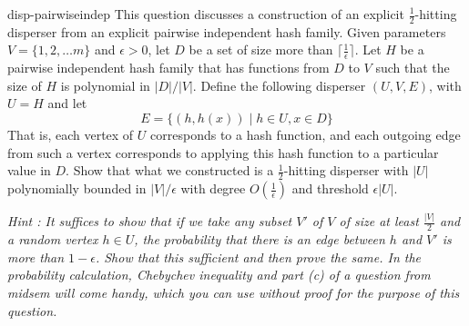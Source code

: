 \begin{exercise-prob}
\begin{show-ps4}{disp-pairwiseindep}
This question discusses a construction of an explicit $\frac{1}{2}$-hitting disperser from an explicit pairwise independent hash family. Given parameters $V = \{1,2,\ldots m\}$ and $\epsilon > 0$, let $D$ be a set of size more than $\lceil \frac{1}{\epsilon} \rceil$. Let $H$ be a pairwise independent hash family that has functions from $D$ to $V$ such that the size of $H$ is polynomial in $|D|/|V|$. Define the following disperser $(U,V,E)$, with $U = H$ and let $$E = \{(h,h(x)) \mid h \in U, x \in D\}$$ That is, each vertex of $U$ corresponds to a hash function, and each outgoing edge from such a vertex corresponds to applying this hash function to a particular value in $D$. Show that what we constructed is a $\frac{1}{2}$-hitting disperser with $|U|$ polynomially bounded in $|V|/\epsilon$ with degree $O(\frac{1}{\epsilon})$ and threshold $\epsilon |U|$.

{\em Hint : It suffices to show that if we take any subset $V'$ of $V$ of size at least $\frac{|V|}{2}$ and a random vertex $h \in U$, the probability that there is an edge between $h$ and $V'$ is more than $1-\epsilon$. Show that this sufficient and then prove the same. In the probability calculation, Chebychev inequality and part (c) of a question from midsem will come handy, which you can use without proof for the purpose of this question.}
\end{show-ps4}
\end{exercise-prob}

